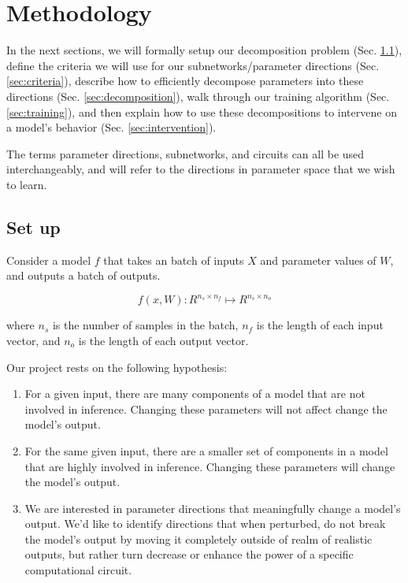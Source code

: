 \documentclass{article}
\theoremstyle{plain}
\theoremstyle{definition}
\theoremstyle{remark}
\begin{document}
\section{Methodology}

In the next sections, we will formally setup our decomposition problem (Sec. \ref{sec:setup}), define the criteria we will use for our subnetworks/parameter directions (Sec. \ref{sec:criteria}), describe how to efficiently decompose parameters into these directions (Sec. \ref{sec:decomposition}), walk through our training algorithm (Sec. \ref{sec:training}), and then explain how to use these decompositions to intervene on a model's behavior (Sec. \ref{sec:intervention}). 

The terms parameter directions, subnetworks, and circuits can all be used interchangeably, and will refer to the directions in parameter space that we wish to learn. 

\subsection{Set up}\label{sec:setup}


Consider a model $f$ that takes an batch of inputs $X$ and parameter values of $W$, and outputs a batch of outputs.

\begin{equation}
    f(x, W) : R^{n_s \times n_f} \mapsto R^{n_s \times n_o}
\end{equation}

where $n_s$ is the number of samples in the batch, $n_f$ is the length of each input vector, and $n_o$ is the length of each output vector.

Our project rests on the following hypothesis: 

\begin{enumerate}
    \item For a given input, there are many components of a model that are not involved in inference. Changing these parameters will not affect change the model's output. 
    \item For the same given input, there are a smaller set of components in a model that are highly involved in inference. Changing these parameters will change the model's output.
    \item We are interested in parameter directions that meaningfully change a model's output. We'd like to identify directions that when perturbed, do not break the model's output by moving it completely outside of realm of realistic outputs, but rather turn decrease or enhance the power of a specific computational circuit. 
\end{enumerate}
\end{document}
